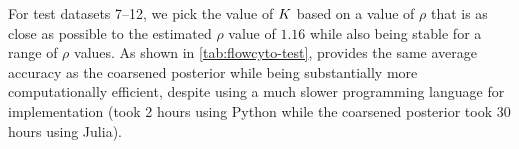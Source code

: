 %




For test datasets 7--12, we pick the value of $K$ based on a value of $\rho$ that is as close as possible to the estimated $\rho$ value of $1.16$ while also being stable for a range of $\rho$ values.
As shown in \cref{tab:flowcyto-test}, \methodname provides the same average accuracy as the coarsened posterior
while being substantially more computationally efficient, despite using a much slower programming language for implementation (\methodname took 2 hours using Python while the coarsened posterior took 30 hours using Julia). %


